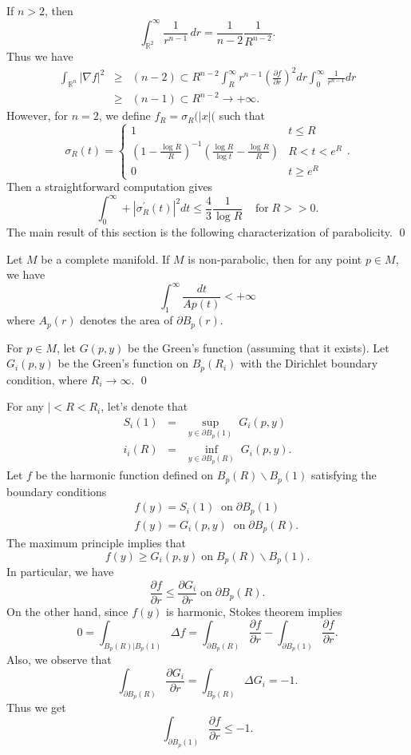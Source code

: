  If $ n > 2 $, then 
%
\[ \int ^\infty_{\mathbb{R}^2} \frac{1}{r^{n-1}} \, d r = \frac{1}{n-2} \frac{1}{R^{n-2}}.\]
Thus we have 
\begin{eqnarray*}
\int_{\mathbb{R}^n} | \nabla f|^2 &\geq &(n-2) \subset R^{n-2} \int ^\infty_R r ^{n-1} \left( \frac{\partial f}{\partial r} \right)^2 dr \int^\infty_0 \frac{1}{r^{n-1}} dr \\
& \geq& (n-1) \subset R^{n-2} \rightarrow + \infty .
\end{eqnarray*}
However, for $ n = 2$, we define $ f_R = \sigma _R (|x|( $ such that 
%
\[ \sigma _R (t) = \left\{ \begin{array} {ll} 1 & t \leq R\\
\left( 1 - \frac{\log R}{R}\right) ^{-1} \left( \frac{\log R}{\log t} - \frac{\log R}{R} \right) & R < t < e ^R\\
0 & t \geq e^R 
\end{array} \right. .\]
%
Then a straightforward computation gives
%
\[\int^\infty_0 + | \sigma ^\prime _R (t) |^2 dt \leq \frac{4}{3} \frac{1}{\log R} \; \;\;\; \mbox{for}\; R >>0 .\]
The main result of this section is the following characterization of parabolicity.
\qed

\begin{theorem} Let $M$ be a complete manifold. If $ M$ is non-parabolic, then for any point $ p \in M$, we have 
%
\[ \int^\infty_1 \frac{dt}{Ap(t)} < + \infty\]
%
where $ A_p (r) $ denotes the area of $ \partial B_p (r) $.
\end{theorem}

 For $ p\in M $, let $ G(p, y) $ be the Green's function (assuming that it exists). Let $ G_i (p, y) $ be the Green's function on $ B_p (R_i) $ with the Dirichlet boundary condition, where $ R_i \rightarrow   \infty $.
\qed

For any $ |< R< R_i $, let's denote that 
\begin{eqnarray*}
S_i(1) & = & \sup_{y 
\in \partial B_{p}(1)} \; G_i (p, y) \\
i_i(R) & = & \inf_{y 
\in \partial B_{p}(R)} \; G_i (p, y)  .
\end{eqnarray*}
Let $f$ be the harmonic function defined on $ B_p (R) \backslash B_p (1) $ satisfying the boundary conditions
%
\begin{eqnarray*} &&f(y) = S_i (1) \; \;\mbox{on}\; \partial B_p(1) \\
&&f(y) = G_i (p, y) \;\;\mbox{on}\; \partial B_p(R) .
\end{eqnarray*}
The maximum principle implies that 
%
\[ f (y) \geq G_i (p, y) \;\mbox{on} \; B_p (R) \backslash B_p (1) .\]
In particular, we have 
%
\[ \frac{\partial f}{\partial r} \leq \frac{\partial G_i}{\partial r} \; \mbox{on}\; \partial B_p (R) .\]
%
On the other hand, since $ f(y)$ is harmonic, Stokes theorem implies 
%
\[ 0 = \int _{B_{p} (R) | B_{p} (1) } \Delta f = \int _{\partial B_{p} (R)} \frac{\partial f}{\partial r} - 
\int _{\partial B_{p} (1)}\frac{\partial f}{\partial r}.\]
%
Also, we observe that 
\[\int _{\partial B_{p} (R)}  \frac{\partial G_{i}}{\partial r} = \int _{ B_{p} (R)}  \Delta G_i = - 1 .\]
%
Thus we get 
%
\[ \int _{\partial B_{p} (1)}  \frac{\partial f}{\partial r} \leq - 1 .\]

